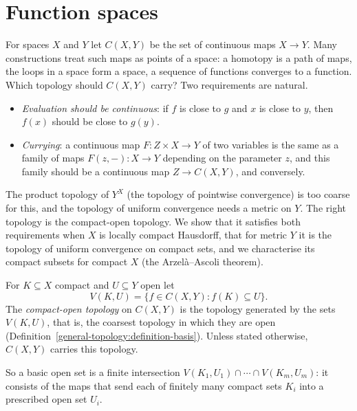 \section{Function spaces}\label{general-topology:section-function-spaces}

For spaces $X$ and $Y$ let $C(X, Y)$ be the set of continuous maps $X \to Y$. Many constructions treat such maps as points of a space: a homotopy is a path of maps, the loops in a
space form a space, a sequence of functions converges to a function. Which topology should $C(X, Y)$ carry? Two requirements are natural.
\begin{itemize}
\item \emph{Evaluation should be continuous}: if $f$ is close to $g$ and $x$ is close to $y$, then $f(x)$ should be close to $g(y)$.
\item \emph{Currying}: a continuous map $F \colon Z \times X \to Y$ of two variables is the same as a family of maps $F(z, -) \colon X \to Y$ depending on the parameter $z$, and this family should be a
continuous map $Z \to C(X, Y)$, and conversely.
\end{itemize}
The product topology of $Y^X$ (the topology of pointwise convergence) is too coarse for this, and the topology of uniform convergence needs a metric on $Y$. The right topology is the compact-open
topology. We show that it satisfies both requirements when $X$ is locally compact Hausdorff, that for metric $Y$ it is the topology of uniform convergence on compact sets, and we characterise its
compact subsets for compact $X$ (the Arzel\`a--Ascoli theorem).

\begin{definition}\label{general-topology:definition-compact-open}
For $K \subseteq X$ compact and $U \subseteq Y$ open let
\[
V(K, U) = \{f \in C(X, Y) : f(K) \subseteq U\}.
\]
The \emph{compact-open topology} on $C(X, Y)$ is the topology generated by the sets $V(K, U)$, that is, the coarsest topology in which they are open
(Definition~\ref{general-topology:definition-basis}). Unless stated otherwise, $C(X, Y)$ carries this topology.
\end{definition}

So a basic open set is a finite intersection $V(K_1, U_1) \cap \cdots \cap V(K_m, U_m)$: it consists of the maps that send each of finitely many compact sets $K_i$ into a prescribed open set $U_i$.

